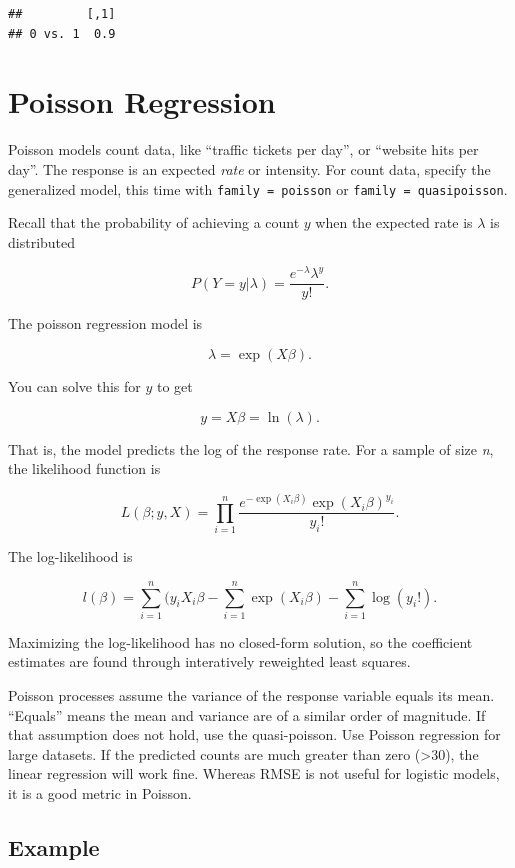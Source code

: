 \documentclass[
]{book}
\begin{document}
\begin{verbatim}
##         [,1]
## 0 vs. 1  0.9
\end{verbatim}

\hypertarget{poisson-regression}{%
\section{Poisson Regression}\label{poisson-regression}}

Poisson models count data, like ``traffic tickets per day'', or ``website hits per day''. The response is an expected \emph{rate} or intensity. For count data, specify the generalized model, this time with \texttt{family\ =\ poisson} or \texttt{family\ =\ quasipoisson}.

Recall that the probability of achieving a count \(y\) when the expected rate is \(\lambda\) is distributed

\[P(Y = y|\lambda) = \frac{e^{-\lambda} \lambda^y}{y!}.\]

The poisson regression model is

\[\lambda = \exp(X \beta).\]

You can solve this for \(y\) to get

\[y = X\beta = \ln(\lambda).\]

That is, the model predicts the log of the response rate. For a sample of size \emph{n}, the likelihood function is

\[L(\beta; y, X) = \prod_{i=1}^n \frac{e^{-\exp({X_i\beta})}\exp({X_i\beta})^{y_i}}{y_i!}.\]

The log-likelihood is

\[l(\beta) = \sum_{i=1}^n (y_i X_i \beta - \sum_{i=1}^n\exp(X_i\beta) - \sum_{i=1}^n\log(y_i!).\]

Maximizing the log-likelihood has no closed-form solution, so the coefficient estimates are found through interatively reweighted least squares.

Poisson processes assume the variance of the response variable equals its mean. ``Equals'' means the mean and variance are of a similar order of magnitude. If that assumption does not hold, use the quasi-poisson. Use Poisson regression for large datasets. If the predicted counts are much greater than zero (\textgreater30), the linear regression will work fine. Whereas RMSE is not useful for logistic models, it is a good metric in Poisson.

\hypertarget{example-17}{%
\subsection*{Example}\label{example-17}}
\end{document}
